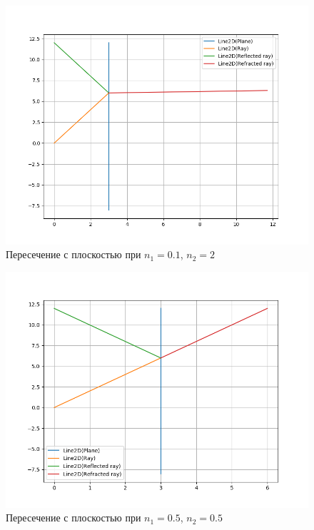 {	\begin{figure}[H]
		\centering
		\includegraphics[width=0.65\pagewidth]{plane_intersect2}
		\caption{Пересечение с плоскостью при $n_1 = 0.1$, $n_2 = 2$}
		\label{plane_intersect2}
	\end{figure}
	
	\begin{figure}[H]
		\centering
		\includegraphics[width=0.65\pagewidth]{plane_intersect3}
		\caption{Пересечение с плоскостью при $n_1 = 0.5$, $n_2 = 0.5$}
		\label{plane_intersect3}
	\end{figure}
}

\newpage


